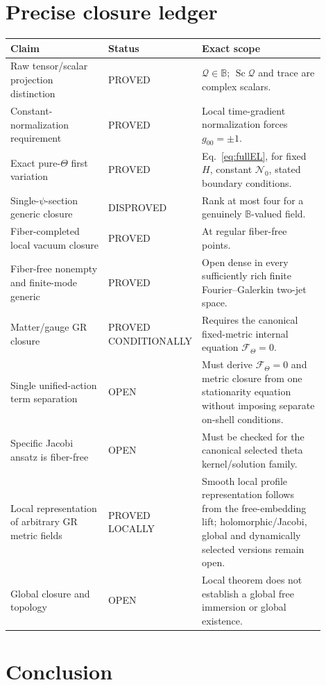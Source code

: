 \documentclass[11pt,a4paper]{article}
\theoremstyle{remark}
\newcommand{\B}{\mathbb B}
\newcommand{\Sc}{\operatorname{Sc}}
\newcommand{\F}{\mathscr F}
\newcommand{\Nzero}{\mathcal N_0}
\begin{document}
\section{Precise closure ledger}

\begin{center}
\begin{tabular}{p{0.32\linewidth}p{0.18\linewidth}p{0.40\linewidth}}
\hline
Claim & Status & Exact scope \\
\hline
Raw tensor/scalar projection distinction & PROVED & $\mathcal Q\in\B$; $\Sc\mathcal Q$ and trace are complex scalars. \\
Constant-normalization requirement & PROVED & Local time-gradient normalization forces $g_{00}=\pm1$. \\
Exact pure-$\Theta$ first variation & PROVED & Eq.~\eqref{eq:fullEL}, for fixed $H$, constant $\Nzero$, stated boundary conditions. \\
Single-$\psi$-section generic closure & DISPROVED & Rank at most four for a genuinely $\B$-valued field. \\
Fiber-completed local vacuum closure & PROVED & At regular fiber-free points. \\
Fiber-free nonempty and finite-mode generic & PROVED & Open dense in every sufficiently rich finite Fourier--Galerkin two-jet space. \\
Matter/gauge GR closure & PROVED CONDITIONALLY & Requires the canonical fixed-metric internal equation $\F_\Theta=0$. \\
Single unified-action term separation & OPEN & Must derive $\F_\Theta=0$ and metric closure from one stationarity equation without imposing separate on-shell conditions. \\
Specific Jacobi ansatz is fiber-free & OPEN & Must be checked for the canonical selected theta kernel/solution family. \\
Local representation of arbitrary GR metric fields & PROVED LOCALLY & Smooth local profile representation follows from the free-embedding lift; holomorphic/Jacobi, global and dynamically selected versions remain open. \\
Global closure and topology & OPEN & Local theorem does not establish a global free immersion or global existence. \\
\hline
\end{tabular}
\end{center}

\section{Conclusion}
\end{document}
